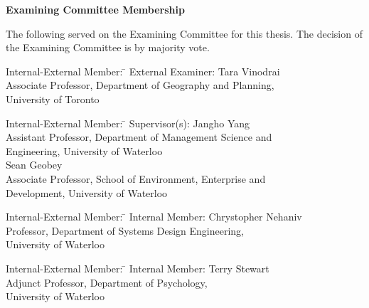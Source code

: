 \begin{center}\textbf{Examining Committee Membership}\end{center}
  \noindent
The following served on the Examining Committee for this thesis. The decision of the Examining Committee is by majority vote.
  \bigskip
  
  \noindent
\begin{tabbing}
Internal-External Member: \=  \kill %
External Examiner: \>  Tara Vinodrai \\ 
\> Associate Professor, Department of Geography and Planning, \\
\> University of Toronto \\
\end{tabbing} 
  \bigskip
  
  \noindent
\begin{tabbing}
Internal-External Member: \=  \kill %
Supervisor(s): \> Jangho Yang \\
\> Assistant Professor, Department of Management Science and \\ 
\> Engineering, University of Waterloo \\
\> Sean Geobey \\
\> Associate Professor, School of Environment, Enterprise and \\
\> Development, University of Waterloo \\
\end{tabbing}
  \bigskip

  \noindent
\begin{tabbing}
Internal-External Member: \=  \kill %
Internal Member: \> Chrystopher Nehaniv \\
\> Professor, Department of Systems Design Engineering, \\
\> University of Waterloo \\
\end{tabbing}
  \bigskip

  \noindent
\begin{tabbing}
Internal-External Member: \=  \kill %
Internal Member: \> Terry Stewart \\
\> Adjunct Professor, Department of Psychology, \\
\> University of Waterloo \\
\end{tabbing}
  \bigskip

